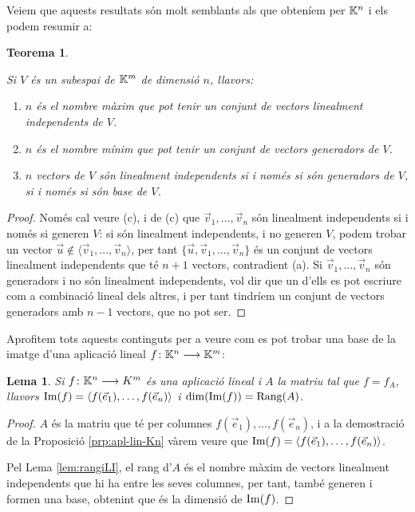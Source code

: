 \documentclass[
  11pt,
]{book}
\numberwithin{dummy}{section}
\theoremstyle{maincolornumbox}
\newtheorem{theorem}{TTTT}[chapter]
\newtheorem{theoremeT}{Teorema}[chapter]
\theoremstyle{blacknumex}
\theoremstyle{blacknumbox}
\theoremstyle{maincolornum}
\newtheorem{lemmaT}{Lema}[chapter]
\renewenvironment{theorem}{\begin{tBox}\begin{theoremeT}}{\end{theoremeT}\end{tBox}}
\newenvironment{lemma}{\begin{pBox}\begin{lemmaT}}{\end{lemmaT}\end{pBox}}
\newlength\esp
\begin{document}
Veiem que aquests resultats són molt semblants als que obteníem per
\(\mathbb{K}^n\) i els podem resumir a:

\begin{theorem}
\protect\hypertarget{thm:baseV}{}\label{thm:baseV}

Si \(V\) és un subespai de \(\mathbb{K}^m\) de
dimensió \(n\), llavors:

\begin{enumerate}
\def\labelenumi{\arabic{enumi}.}
\item
  \(n\) és el nombre màxim que pot tenir un conjunt de vectors
  linealment independents de \(V\).
\item
  \(n\) és el nombre mínim que pot tenir un conjunt de vectors
  generadors de \(V\).
\item
  \(n\) vectors de \(V\) són linealment independents si i només si són
  generadors de \(V\), si i només si són base de \(V\).
\end{enumerate}

\end{theorem}

\begin{proof}
Només cal veure (c), i de (c) que \(\vec v_1, \dots , \vec v_n\)
són linealment independents si i només si generen \(V\): si són linealment
independents, i no generen \(V\), podem trobar un vector
\(\vec u\not\in\langle \vec v_1,\dots, \vec v_n\rangle\), per tant
\(\{\vec u, \vec v_1,\dots,\vec v_n\}\) és un conjunt de vectors
linealment independents que té \(n+1\) vectors, contradient (a). Si
\(\vec v_1, \dots , \vec v_n\) són generadors i no són linealment
independents, vol dir que un d'ells es pot escriure com a combinació
lineal dels altres, i per tant tindríem un conjunt de vectors generadors
amb \(n-1\) vectors, que no pot ser.
\end{proof}

Aprofitem tots aquests continguts per a veure com es pot trobar una base
de la imatge d'una aplicació lineal \(f\colon \mathbb{K}^n\longrightarrow \mathbb{K}^m\):

\begin{lemma}
\protect\hypertarget{lem:imfA}{}\label{lem:imfA}Si \(f\colon \mathbb{K}^n \longrightarrow K^m\) és una
aplicació lineal i \(A\) la matriu tal que \(f=f_A\), llavors
\(\operatorname{Im}(f)=\langle f(\vec e_1), \dots, f(\vec e_n) \rangle\) i
\(\dim(\operatorname{Im}(f))=\operatorname{Rang}(A)\).
\end{lemma}

\begin{proof}
\(A\) és la matriu que té per columnes
\(f(\vec e_1), \dots, f(\vec e_n)\), i a la demostració de la Proposició
\ref{prp:apl-lin-Kn} vàrem veure que
\(\operatorname{Im}(f)=\langle f(\vec e_1), \dots, f(\vec e_n) \rangle\).

Pel Lema \ref{lem:rangiLI}, el rang d'\(A\) és el nombre màxim de vectors
linealment independents que hi ha entre les seves columnes, per tant,
també generen i formen una base, obtenint que és la dimensió de
\(\operatorname{Im}(f)\).
\end{proof}
\end{document}
